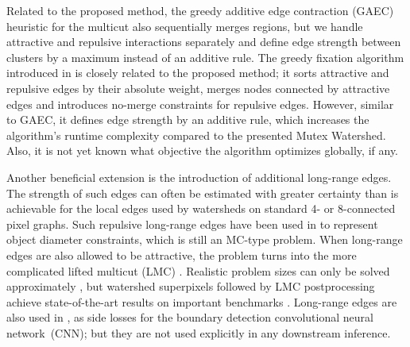 




Related to the proposed method, the greedy additive edge contraction (GAEC) \cite{keuper2015efficient} heuristic for the multicut also sequentially merges regions, but we handle attractive and repulsive interactions separately and define edge strength between clusters by a maximum instead of an additive rule.
The greedy fixation algorithm introduced in \cite{levinkov2017comparative} is closely related to the proposed method; it sorts attractive and repulsive edges by their absolute
weight, merges nodes connected by attractive edges and introduces no-merge constraints
for repulsive edges. However, similar to GAEC, it defines edge strength by an additive rule,
which increases the algorithm's runtime complexity compared to the presented Mutex Watershed. Also, it is not yet known what objective the algorithm optimizes globally, if any.

Another beneficial extension is the introduction of additional long-range edges. The strength of such edges can often be estimated with greater certainty than is achievable for the local edges used by watersheds on standard 4- or 8-connected pixel graphs. Such repulsive long-range edges have been used in \cite{zhang_14_cell} to represent object diameter constraints, which is still an MC-type problem. When long-range edges are also allowed to be attractive, the problem turns into the more complicated lifted multicut (LMC) \cite{horvnakova2017analysis}. Realistic problem sizes can only be solved approximately \cite{keuper2015efficient,beier2016efficient}, but watershed superpixels followed by LMC postprocessing achieve state-of-the-art results on important benchmarks \cite{beier2017multicut}. Long-range edges are also used in \cite{lee2017superhuman}, as side losses for the boundary detection convolutional neural network~(CNN); but they are not used explicitly in any downstream inference.

